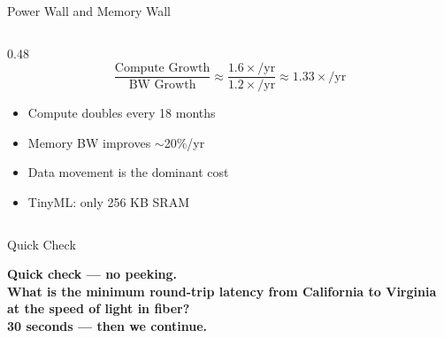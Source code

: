 \documentclass[aspectratio=169, 12pt]{beamer}
\begin{document}
\begin{frame}{Power Wall and Memory Wall}
\begin{columns}[T]
\begin{column}{0.48\textwidth}
    \vspace{0.1cm}
    $$\frac{\text{Compute Growth}}{\text{BW Growth}} \approx \frac{1.6\times\text{/yr}}{1.2\times\text{/yr}} \approx 1.33\times\text{/yr}$$

    \vspace{0.1cm}
    \begin{itemize}\setlength\itemsep{1pt}
      \item Compute doubles every 18 months
      \item Memory BW improves $\sim$20\%/yr
      \item Data movement is the dominant cost
      \item TinyML: only 256 KB SRAM
    \end{itemize}

    \vspace{0.05cm}
  \end{column}
\end{columns}

\end{frame}

\begin{frame}{Quick Check}
\note{
%
}

\centering
\Large\bfseries Quick check --- no peeking.\\[0.5cm]
\normalsize What is the minimum round-trip latency from California to Virginia at the speed of light in fiber?\\[0.3cm]
{\small 30 seconds --- then we continue.}
\end{frame}
\end{document}
